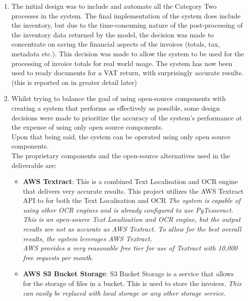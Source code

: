 \begin{enumerate}
	\item The initial design was to include and automate all the Category Two processes in the
	      system. The final implementation of the system does include the inventory, but due to the time-consuming nature of the post-processing of the
	      inventory data returned by the model, the decision was made to concentrate on saving the financial aspects
	      of the invoices (totals, tax, metadata etc.). This decision was made to allow the system to be used for the processing of invoice totals for
	      real world usage. The system has now been used to ready documents for a VAT return, with surprisingly accurate results.
	      (this is reported on in greater detail later)
	\item Whilst trying to balance the goal of using open-source components with creating a system that performs as effectively as possible, some
	      design decisions were made to prioritize the accuracy of the system's performance at the expense of using only open source components.\\
	      Upon that being said, the system can be operated using only open source components.\\
	      The proprietary components and the open-source alternatives used in the deliverable are:
	      \begin{itemize}
		      \item \textbf{AWS Textract}: This is a combined Text Localisation and OCR engine that delivers very accurate results. This project
		            utilizes the AWS Textract API to for both the Text Localisation and OCR
		            \bigbreak
		            \emph{The system is capable of using other OCR engines and is already configured to use PyTesseract. This is an open-source Text
			            Localisation and OCR engine, but the output results are not as accurate as AWS Textract. To allow for the best overall results,
			            the system leverages AWS Textract.\\ AWS provides a very reasonable free tier for use of Textract with 10,000 free requests per month.}
		      \item \textbf{AWS S3 Bucket Storage}: S3 Bucket Storage is a service that allows for the storage of files in a bucket. This is used to store the
		            invoices.
		            \bigbreak
		            \emph{This can easily be replaced with local storage or any other storage service.}
	      \end{itemize}
\end{enumerate}
